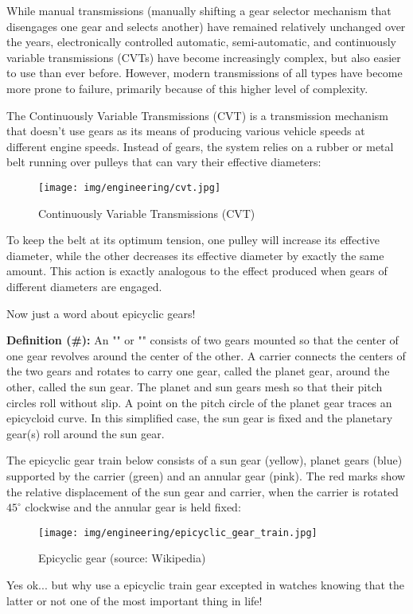 	While manual transmissions (manually shifting a gear selector mechanism that disengages one gear and selects another) have remained relatively unchanged over the years, electronically controlled automatic, semi-automatic, and continuously variable transmissions (CVTs) have become increasingly complex, but also easier to use than ever before. However, modern transmissions of all types have become more prone to failure, primarily because of this higher level of complexity.
	
	The Continuously Variable Transmissions (CVT) is a transmission mechanism that doesn’t use gears as its means of producing various vehicle speeds at different engine speeds. Instead of gears, the system relies on a rubber or metal belt running over pulleys that can vary their effective diameters:
	\begin{figure}[H]
		\centering
		\texttt{[image: img/engineering/cvt.jpg]}
		\caption{Continuously Variable Transmissions (CVT)}
	\end{figure}
	To keep the belt at its optimum tension, one pulley will increase its effective diameter, while the other decreases its effective diameter by exactly the same amount. This action is exactly analogous to the effect produced when gears of different diameters are engaged.
	
	Now just a word about epicyclic gears!
	
	\textbf{Definition (\#\mydef):} An "" or "" consists of two gears mounted so that the center of one gear revolves around the center of the other. A carrier connects the centers of the two gears and rotates to carry one gear, called the planet gear, around the other, called the sun gear. The planet and sun gears mesh so that their pitch circles roll without slip. A point on the pitch circle of the planet gear traces an epicycloid curve. In this simplified case, the sun gear is fixed and the planetary gear(s) roll around the sun gear.
	
	The epicyclic gear train below consists of a sun gear (yellow), planet gears (blue) supported by the carrier (green) and an annular gear (pink). The red marks show the relative displacement of the sun gear and carrier, when the carrier is rotated $45^\circ$ clockwise and the annular gear is held fixed:
	\begin{figure}[H]
		\centering
		\texttt{[image: img/engineering/epicyclic\_gear\_train.jpg]}
		\caption{Epicyclic gear (source: Wikipedia)}
	\end{figure}
	Yes ok... but why use a epicyclic train gear excepted in watches knowing that the latter or not one of the most important thing in life!
	
